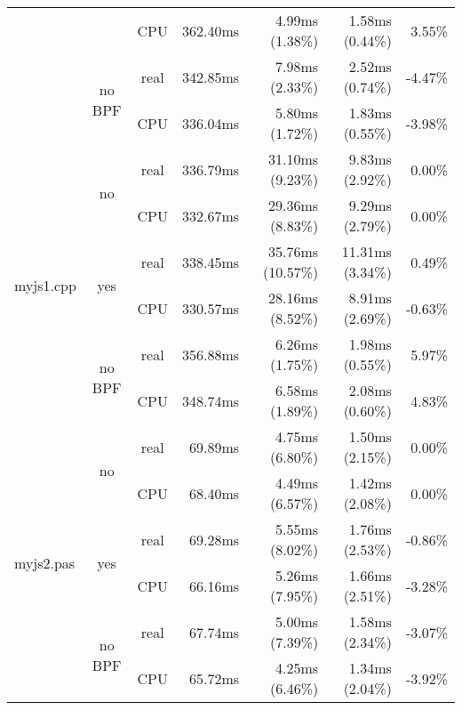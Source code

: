 \documentclass[en]{pracamgr}
\begin{document}
\begin{appendices}
\begin{small}
\begin{longtable}{|l|c|c|r|r|r|r|}
                            &                         & CPU  & 362.40ms & 4.99ms (1.38\%) & 1.58ms (0.44\%) & 3.55\% \\*
                            \cline{2-7}
                            & \multirow{2}{*}{no BPF} & real & 342.85ms & 7.98ms (2.33\%) & 2.52ms (0.74\%) & -4.47\% \\*
                            &                         & CPU  & 336.04ms & 5.80ms (1.72\%) & 1.83ms (0.55\%) & -3.98\% \\
\hline
\multirow{6}{*}{myjs1.cpp}  & \multirow{2}{*}{no}     & real & 336.79ms & 31.10ms (9.23\%) & 9.83ms (2.92\%) & 0.00\% \\*
                            &                         & CPU  & 332.67ms & 29.36ms (8.83\%) & 9.29ms (2.79\%) & 0.00\% \\*
                            \cline{2-7}
                            & \multirow{2}{*}{yes}    & real & 338.45ms & 35.76ms (10.57\%) & 11.31ms (3.34\%) & 0.49\% \\*
                            &                         & CPU  & 330.57ms & 28.16ms (8.52\%) & 8.91ms (2.69\%) & -0.63\% \\*
                            \cline{2-7}
                            & \multirow{2}{*}{no BPF} & real & 356.88ms & 6.26ms (1.75\%) & 1.98ms (0.55\%) & 5.97\% \\*
                            &                         & CPU  & 348.74ms & 6.58ms (1.89\%) & 2.08ms (0.60\%) & 4.83\% \\
\hline
\multirow{6}{*}{myjs2.pas}  & \multirow{2}{*}{no}     & real & 69.89ms & 4.75ms (6.80\%) & 1.50ms (2.15\%) & 0.00\% \\*
                            &                         & CPU  & 68.40ms & 4.49ms (6.57\%) & 1.42ms (2.08\%) & 0.00\% \\*
                            \cline{2-7}
                            & \multirow{2}{*}{yes}    & real & 69.28ms & 5.55ms (8.02\%) & 1.76ms (2.53\%) & -0.86\% \\*
                            &                         & CPU  & 66.16ms & 5.26ms (7.95\%) & 1.66ms (2.51\%) & -3.28\% \\*
                            \cline{2-7}
                            & \multirow{2}{*}{no BPF} & real & 67.74ms & 5.00ms (7.39\%) & 1.58ms (2.34\%) & -3.07\% \\*
                            &                         & CPU  & 65.72ms & 4.25ms (6.46\%) & 1.34ms (2.04\%) & -3.92\% \\

\end{longtable}
\end{small}
\end{appendices}
\end{document}
